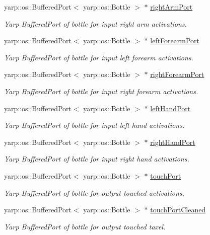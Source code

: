 \begin{DoxyCompactItemize}
yarp\+::os\+::\+Buffered\+Port$<$ yarp\+::os\+::\+Bottle $>$ $\ast$ \hyperlink{group__touchDetector_a8522b0d27f973b9a8c8b2e10c656f9b3}{right\+Arm\+Port}
\begin{DoxyCompactList}\small\item\em Yarp Buffered\+Port of bottle for input right arm activations. \end{DoxyCompactList}\item 
yarp\+::os\+::\+Buffered\+Port$<$ yarp\+::os\+::\+Bottle $>$ $\ast$ \hyperlink{group__touchDetector_ac34d0d0c972146971c59c9150b2fcbc4}{left\+Forearm\+Port}
\begin{DoxyCompactList}\small\item\em Yarp Buffered\+Port of bottle for input left forearm activations. \end{DoxyCompactList}\item 
yarp\+::os\+::\+Buffered\+Port$<$ yarp\+::os\+::\+Bottle $>$ $\ast$ \hyperlink{group__touchDetector_a905ee0fe0ed60104b941d044386856a5}{right\+Forearm\+Port}
\begin{DoxyCompactList}\small\item\em Yarp Buffered\+Port of bottle for input right forearm activations. \end{DoxyCompactList}\item 
yarp\+::os\+::\+Buffered\+Port$<$ yarp\+::os\+::\+Bottle $>$ $\ast$ \hyperlink{group__touchDetector_a6b373d5f8e235c68ce5526909c44074f}{left\+Hand\+Port}
\begin{DoxyCompactList}\small\item\em Yarp Buffered\+Port of bottle for input left hand activations. \end{DoxyCompactList}\item 
yarp\+::os\+::\+Buffered\+Port$<$ yarp\+::os\+::\+Bottle $>$ $\ast$ \hyperlink{group__touchDetector_af6585ff213a437baa0b232304f0f9a68}{right\+Hand\+Port}
\begin{DoxyCompactList}\small\item\em Yarp Buffered\+Port of bottle for input right hand activations. \end{DoxyCompactList}\item 
yarp\+::os\+::\+Buffered\+Port$<$ yarp\+::os\+::\+Bottle $>$ $\ast$ \hyperlink{group__touchDetector_aba1732a9b24e61da4ad3ed1650a214ea}{touch\+Port}
\begin{DoxyCompactList}\small\item\em Yarp Buffered\+Port of bottle for output touched activations. \end{DoxyCompactList}\item 
yarp\+::os\+::\+Buffered\+Port$<$ yarp\+::os\+::\+Bottle $>$ $\ast$ \hyperlink{group__touchDetector_aefc680e659906e2a9b7e870d8ea837be}{touch\+Port\+Cleaned}
\begin{DoxyCompactList}\small\item\em Yarp Buffered\+Port of bottle for output touched taxel. \end{DoxyCompactList}\end{DoxyCompactItemize}
